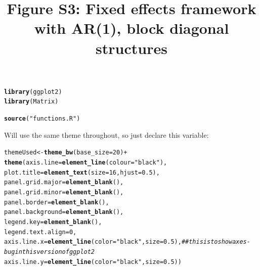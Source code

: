 \documentclass{article}\usepackage[]{graphicx}\usepackage[]{color}
\title{Figure S3: Fixed effects framework with AR(1), block diagonal structures}
\makeatletter
\newcommand{\hlnum}[1]{\textcolor[rgb]{0.686,0.059,0.569}{#1}}%
\newcommand{\hlstr}[1]{\textcolor[rgb]{0.192,0.494,0.8}{#1}}%
\newcommand{\hlcom}[1]{\textcolor[rgb]{0.678,0.584,0.686}{\textit{#1}}}%
\newcommand{\hlopt}[1]{\textcolor[rgb]{0,0,0}{#1}}%
\newcommand{\hlstd}[1]{\textcolor[rgb]{0.345,0.345,0.345}{#1}}%
\newcommand{\hlkwb}[1]{\textcolor[rgb]{0.69,0.353,0.396}{#1}}%
\newcommand{\hlkwc}[1]{\textcolor[rgb]{0.333,0.667,0.333}{#1}}%
\newcommand{\hlkwd}[1]{\textcolor[rgb]{0.737,0.353,0.396}{\textbf{#1}}}%
\newenvironment{kframe}{%
 \def\at@end@of@kframe{}%
 \ifinner\ifhmode%
  \def\at@end@of@kframe{\end{minipage}}%
  \begin{minipage}{\columnwidth}%
 \fi\fi%
 \def\FrameCommand##1{\hskip\@totalleftmargin \hskip-\fboxsep
 \colorbox{shadecolor}{##1}\hskip-\fboxsep
     \hskip-\linewidth \hskip-\@totalleftmargin \hskip\columnwidth}%
 \MakeFramed {\advance\hsize-\width
   \@totalleftmargin\z@ \linewidth\hsize
   \@setminipage}}%
 {\par\unskip\endMakeFramed%
 \at@end@of@kframe}
\newenvironment{knitrout}{}{} %
\makeatother
\begin{document}
\maketitle



\begin{knitrout}
\color{fgcolor}\begin{kframe}
\begin{alltt}
\hlkwd{library}\hlstd{(ggplot2)}
\hlkwd{library}\hlstd{(Matrix)}

\hlkwd{source}\hlstd{(}\hlstr{"functions.R"}\hlstd{)}
\end{alltt}
\end{kframe}
\end{knitrout}

Will use the same theme throughout, so just declare this variable:
\begin{knitrout}
\color{fgcolor}\begin{kframe}
\begin{alltt}
\hlstd{themeUsed} \hlkwb{<-}  \hlkwd{theme_bw}\hlstd{(}\hlkwc{base_size} \hlstd{=} \hlnum{20}\hlstd{)}\hlopt{+}
  \hlkwd{theme}\hlstd{(}\hlkwc{axis.line} \hlstd{=} \hlkwd{element_line}\hlstd{(}\hlkwc{colour} \hlstd{=} \hlstr{"black"}\hlstd{),}
        \hlkwc{plot.title} \hlstd{=} \hlkwd{element_text}\hlstd{(}\hlkwc{size} \hlstd{=} \hlnum{16}\hlstd{,} \hlkwc{hjust} \hlstd{=} \hlnum{0.5}\hlstd{),}
        \hlkwc{panel.grid.major} \hlstd{=} \hlkwd{element_blank}\hlstd{(),}
        \hlkwc{panel.grid.minor} \hlstd{=} \hlkwd{element_blank}\hlstd{(),}
        \hlkwc{panel.border} \hlstd{=} \hlkwd{element_blank}\hlstd{(),}
        \hlkwc{panel.background} \hlstd{=} \hlkwd{element_blank}\hlstd{(),}
        \hlkwc{legend.key} \hlstd{=} \hlkwd{element_blank}\hlstd{(),}
        \hlkwc{legend.text.align} \hlstd{=} \hlnum{0}\hlstd{,}
        \hlkwc{axis.line.x} \hlstd{=} \hlkwd{element_line}\hlstd{(}\hlkwc{color}\hlstd{=}\hlstr{"black"}\hlstd{,} \hlkwc{size} \hlstd{=} \hlnum{0.5}\hlstd{),} \hlcom{##this is to show axes - bug in this version of ggplot2}
        \hlkwc{axis.line.y} \hlstd{=} \hlkwd{element_line}\hlstd{(}\hlkwc{color}\hlstd{=}\hlstr{"black"}\hlstd{,} \hlkwc{size} \hlstd{=} \hlnum{0.5}\hlstd{))}
\end{alltt}
\end{kframe}
\end{knitrout}
  
\end{document}
